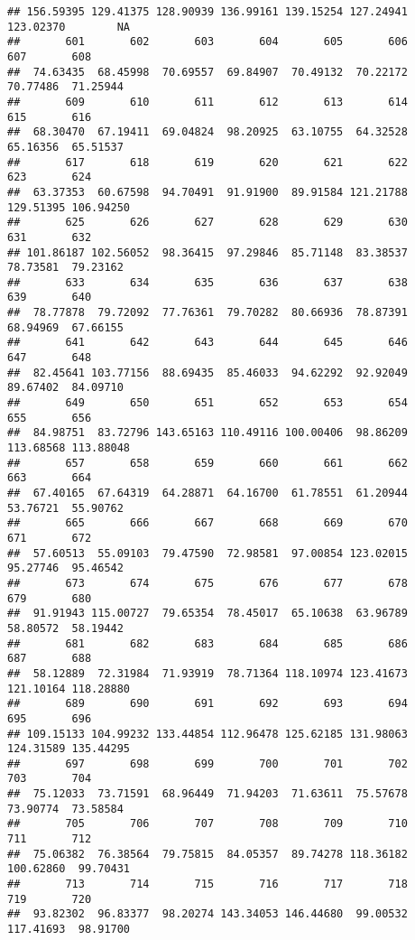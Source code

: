 \documentclass[
]{article}
\begin{document}
\begin{verbatim}
## 156.59395 129.41375 128.90939 136.99161 139.15254 127.24941 123.02370        NA 
##       601       602       603       604       605       606       607       608 
##  74.63435  68.45998  70.69557  69.84907  70.49132  70.22172  70.77486  71.25944 
##       609       610       611       612       613       614       615       616 
##  68.30470  67.19411  69.04824  98.20925  63.10755  64.32528  65.16356  65.51537 
##       617       618       619       620       621       622       623       624 
##  63.37353  60.67598  94.70491  91.91900  89.91584 121.21788 129.51395 106.94250 
##       625       626       627       628       629       630       631       632 
## 101.86187 102.56052  98.36415  97.29846  85.71148  83.38537  78.73581  79.23162 
##       633       634       635       636       637       638       639       640 
##  78.77878  79.72092  77.76361  79.70282  80.66936  78.87391  68.94969  67.66155 
##       641       642       643       644       645       646       647       648 
##  82.45641 103.77156  88.69435  85.46033  94.62292  92.92049  89.67402  84.09710 
##       649       650       651       652       653       654       655       656 
##  84.98751  83.72796 143.65163 110.49116 100.00406  98.86209 113.68568 113.88048 
##       657       658       659       660       661       662       663       664 
##  67.40165  67.64319  64.28871  64.16700  61.78551  61.20944  53.76721  55.90762 
##       665       666       667       668       669       670       671       672 
##  57.60513  55.09103  79.47590  72.98581  97.00854 123.02015  95.27746  95.46542 
##       673       674       675       676       677       678       679       680 
##  91.91943 115.00727  79.65354  78.45017  65.10638  63.96789  58.80572  58.19442 
##       681       682       683       684       685       686       687       688 
##  58.12889  72.31984  71.93919  78.71364 118.10974 123.41673 121.10164 118.28880 
##       689       690       691       692       693       694       695       696 
## 109.15133 104.99232 133.44854 112.96478 125.62185 131.98063 124.31589 135.44295 
##       697       698       699       700       701       702       703       704 
##  75.12033  73.71591  68.96449  71.94203  71.63611  75.57678  73.90774  73.58584 
##       705       706       707       708       709       710       711       712 
##  75.06382  76.38564  79.75815  84.05357  89.74278 118.36182 100.62860  99.70431 
##       713       714       715       716       717       718       719       720 
##  93.82302  96.83377  98.20274 143.34053 146.44680  99.00532 117.41693  98.91700 

\end{verbatim}
\end{document}
